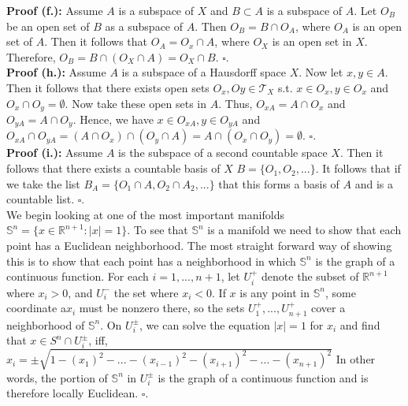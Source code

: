 \documentclass{article}
\begin{document}
\textbf{Proof (f.):} Assume $A$  is a subspace of $X$ and $B\subset A$ is a subspace of $A$. Let $O_B$ be an open set of $B$ as a subspace of $A$. Then $O_B=B\cap O_A$, where $O_A$ is an open set of $A$. Then it follows that $O_A=O_x\cap A$, where $O_X$ is an open set in $X$. Therefore, $O_B=B\cap(O_X\cap A)=O_X\cap B$. $\square$.\\

\textbf{Proof (h.):} Assume $A$ is a subspace of a Hausdorff space $X$. Now let $x,y\in A$. Then it follows that there exists open sets $O_x,Oy\in\mathcal{T}_X$ s.t. $x\in O_x, y\in O_x$ and $O_x\cap O_y=\emptyset$. Now take these open sets in $A$. Thus, $O_{xA}=A\cap O_x$ and $O_{yA}=A\cap O_y$. Hence, we have $x\in O_{xA},y\in O_{yA}$ and $O_{xA}\cap O_{yA}=(A\cap O_x)\cap (O_y\cap A)=A\cap (O_x\cap O_y)=\emptyset$. $\square$.\\

\textbf{Proof (i.):} Assume $A$ is the subspace of a second countable space $X$. Then it follows that there exists a countable basis of $X$ $B=\{O_1,O_2,...\}$. It follows that if we take the list $B_A=\{O_1\cap A, O_2\cap A_2,...\}$ that this forms a basis of $A$ and is a countable list. $\square$.\\

We begin looking at one of the most important manifolds $\mathbb{S}^n=\{x\in\mathbb{R}^{n+1}:|x|=1\}$. To see that $\mathbb{S}^n$ is a manifold we need to show that each point has a Euclidean neighborhood. The most straight forward way of showing this is to show that each point has a neighborhood in which $\mathbb{S}^n$ is the graph of a continuous function. For each $i=1,...,n+1$, let $U_i^+$ denote the subset of $\mathbb{R}^{n+1}$ where $x_i>0$, and $U_i^-$ the set where $x_i<0$. If $x$ is any point in $\mathbb{S}^n$, some coordinate a$x_i$
 must be nonzero there, so the sets $U_1^+,...,U_{n+1}^+$ cover a neighborhood of $\mathbb{S}^n$. On $U_i^{\pm}$, we can solve the equation $|x|=1$ for $x_i$ and find that $x\in S^n\cap U_i^{\pm}$, iff, $x_i=\pm\sqrt{1-(x_1)^2-...-(x_{i-1})^2-(x_{i+1})^2-...-(x_{n+1})^2}$ In other words,
  the portion of $\mathbb{S}^n$ in $U_i^\pm$ is the graph of a continuous function and is therefore locally Euclidean. $\square$.\\
\end{document}
